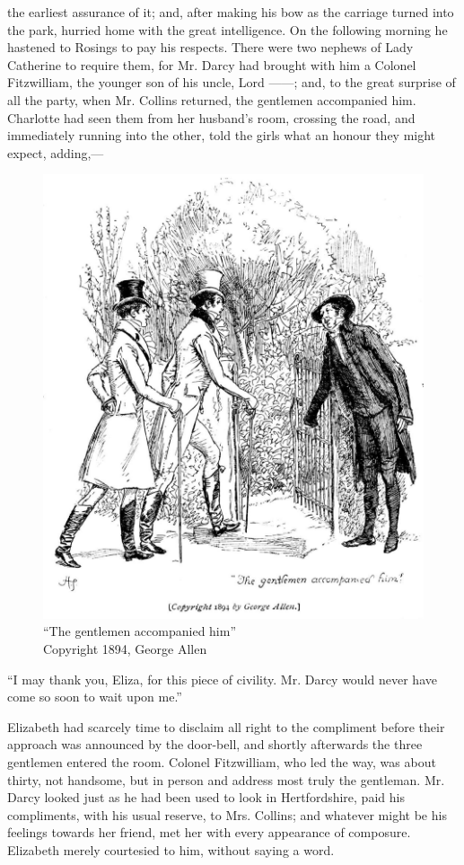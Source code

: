 the earliest assurance of it; and, after making his bow as the carriage turned into the park, hurried home with the great intelligence. On the following morning he hastened to Rosings to pay his respects. There were two nephews of Lady Catherine to require them, for Mr. Darcy had brought with him a Colonel Fitzwilliam, the younger son of his uncle, Lord ------; and, to the great surprise of all the party, when Mr. Collins returned, the gentlemen accompanied him. Charlotte had seen them from her husband's room, crossing the road, and immediately running into the other, told the girls what an honour they might expect, adding,---

\begin{figure}[htbp]
    \centering
    \includegraphics[width=\textwidth]{illustrations/i_242.jpg}
    \caption{“The gentlemen accompanied him”\\ Copyright 1894, George Allen}
    \label{fig:image}
\end{figure}
``I may thank you, Eliza, for this piece of civility. Mr. Darcy would never have come so soon to wait upon me.''

Elizabeth had scarcely time to disclaim all right to the compliment before their approach was announced by the door-bell, and shortly afterwards the three gentlemen entered the room. Colonel Fitzwilliam, who led the way, was about thirty, not handsome, but in person and address most truly the gentleman. Mr. Darcy looked just as he had been used to look in Hertfordshire, paid his compliments, with his usual reserve, to Mrs. Collins; and whatever might be his feelings towards her friend, met her with every appearance of composure. Elizabeth merely courtesied to him, without saying a word.

